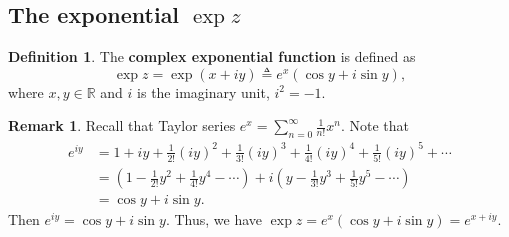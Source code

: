 \documentclass[12pt,openany]{book}
\theoremstyle{definition}
\newtheorem{definition}{Definition}[chapter]
\newtheorem{remark}{Remark}[section]
\newcommand{\R}{\mathbb{R}}
\newcommand{\of}[1]{\left( #1 \right)}
\begin{document}
	\subsection{The exponential $\exp z$}
	\begin{tcolorbox}[colback=white,colframe=defcolor,arc=5pt,title={\color{white}\bf Complex Exponential}]
		\begin{definition}
			The \textbf{complex exponential function} is defined as
			\begin{equation*}
			\exp{z} =\exp{(x+iy)} \triangleq e^{x}(\cos y + i\sin y),
			\end{equation*}
			where $x,y\in\R$ and $i$ is the imaginary unit, $i^2=-1$.
		\end{definition}
	\end{tcolorbox}
	\begin{remark}
		Recall that Taylor series $e^x=\sum_{n=0}^\infty\frac{1}{n!}x^n$. Note that \begin{align*}
		e^{iy}&=1+iy+\frac{1}{2!}(iy)^2+\frac{1}{3!}(iy)^3+\frac{1}{4!}(iy)^4+\frac{1}{5!}(iy)^5+\cdots\\
		&=\of{1-\frac{1}{2!}y^2+\frac{1}{4!}y^4-\cdots}+i\of{y-\frac{1}{3!}y^3+\frac{1}{5!}y^5-\cdots}\\
		&=\cos y+i\sin y.
		\end{align*} Then $e^{iy}=\cos y+i\sin y$. Thus, we have $
		\exp z=e^x(\cos y+i\sin y)=e^{x+iy}.
		$
	\end{remark}
	
\end{document}
